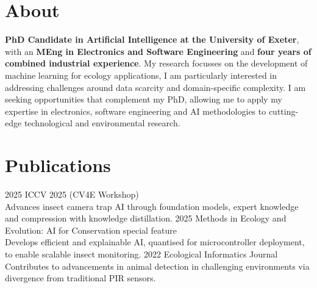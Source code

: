 \documentclass[a4paper]{cv-style}     %
\begin{document}
\section{About}
  \vspace{-0.36cm}

\textbf{PhD Candidate in Artificial Intelligence at the University of Exeter}, with an \textbf{MEng in Electronics and Software Engineering} and \textbf{four years of combined industrial experience}. My research focusses on the development of machine learning for ecology applications, I am particularly interested in addressing challenges around data scarcity and domain-specific complexity. I am seeking opportunities that complement my PhD, allowing me to apply my expertise in electronics, software engineering and AI methodologies to cutting-edge technological and environmental research.
  \vspace{-0.1cm}
\section{Publications}
  \vspace{-0.3cm}
\begin{entrylist}
\entry
{2025}
{ICCV 2025 (CV4E Workshop) }
{}
{ \\ Advances insect camera trap AI through foundation models, expert knowledge and compression with knowledge distillation.}
\entry
{2025}
{Methods in Ecology and Evolution: AI for Conservation special feature}
{}
{ \\ Develops efficient and explainable AI, quantised for microcontroller deployment, to enable scalable insect monitoring. }
  \entry
    {2022}
    {Ecological Informatics Journal}
    {}
    {\\ Contributes to advancements in animal detection in challenging environments via divergence from traditional PIR sensors.}
    \end{entrylist}
  \vspace{-0.2cm}
\end{document}

